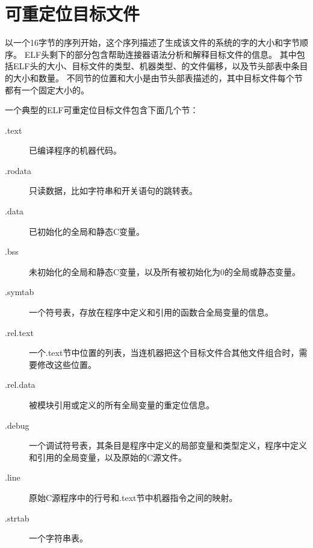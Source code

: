 
\section{可重定位目标文件}
{
    以一个16字节的序列开始，这个序列描述了生成该文件的系统的字的大小和字节顺序。
    ELF头剩下的部分包含帮助连接器语法分析和解释目标文件的信息。
    其中包括ELF头的大小、目标文件的类型、机器类型、的文件偏移，以及节头部表中条目的大小和数量。
    不同节的位置和大小是由节头部表描述的，其中目标文件每个节都有一个固定大小的。

    一个典型的ELF可重定位目标文件包含下面几个节：

    \begin{description}
        \item[.text] 已编译程序的机器代码。
        \item[.rodata] 只读数据，比如字符串和开关语句的跳转表。
        \item[.data] 已初始化的全局和静态C变量。
        \item[.bss] 未初始化的全局和静态C变量，以及所有被初始化为0的全局或静态变量。
        \item[.symtab] 一个符号表，存放在程序中定义和引用的函数合全局变量的信息。
        \item[.rel.text] 一个.text节中位置的列表，当连机器把这个目标文件合其他文件组合时，需要修改这些位置。
        \item[.rel.data] 被模块引用或定义的所有全局变量的重定位信息。
        \item[.debug] 一个调试符号表，其条目是程序中定义的局部变量和类型定义，程序中定义和引用的全局变量，以及原始的C源文件。
        \item[.line] 原始C源程序中的行号和.text节中机器指令之间的映射。
        \item[.strtab] 一个字符串表。
    \end{description}
}
